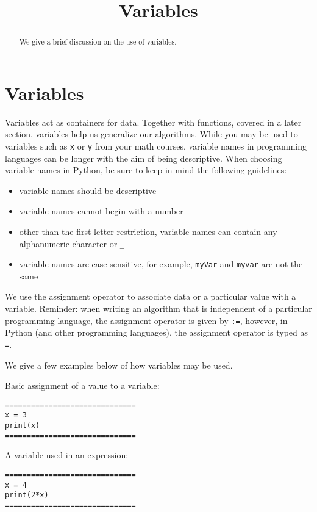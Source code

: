 \documentclass{ximera}
\title{Variables}
\begin{document}
  
\begin{abstract}  
We give a brief discussion on the use of variables.
\end{abstract}  
\maketitle

\section{Variables}

Variables act as containers for data. Together with functions, covered in a later section, variables help us generalize our algorithms. While you may be used to variables such as \verb|x| or \verb|y| from your math courses, variable names in programming languages can be longer with the aim of being descriptive. When choosing variable names in Python, be sure to keep in mind the following guidelines:

\begin{itemize}
	\item variable names should be descriptive
	\item variable names cannot begin with a number
	\item other than the first letter restriction, variable names can contain any alphanumeric character or \verb|_|
	\item variable names are case sensitive, for example, \verb|myVar| and \verb|myvar| are not the same
\end{itemize}

We use the assignment operator to associate data or a particular value with a variable. Reminder: when writing an algorithm that is independent of a particular programming language, the assignment operator is given by \verb|:=|, however, in Python (and other programming languages), the assignment operator is typed as \verb|=|.

We give a few examples below of how variables may be used.

Basic assignment of a value to a variable:

\begin{verbatim}
==============================
x = 3
print(x)
==============================
\end{verbatim}

A variable used in an expression:

\begin{verbatim}
==============================
x = 4
print(2*x)
==============================
\end{verbatim}
\end{document}
